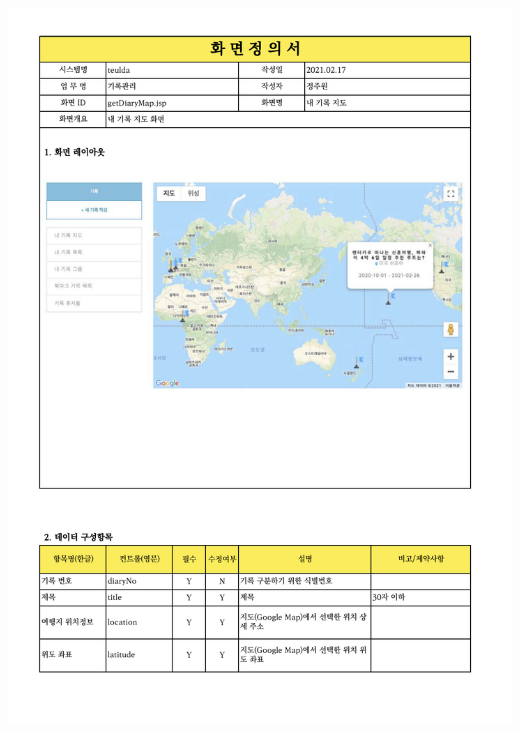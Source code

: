 {{{{{{{{{{{{{{{{{{{{{{{{{{{{{{{\includegraphics[width=20cm]{./Figure/Design/Display/diary/diary_13.pdf} \\
}}}}}}}}}}}}}}}}}}}}}}}}}}}}}}}
